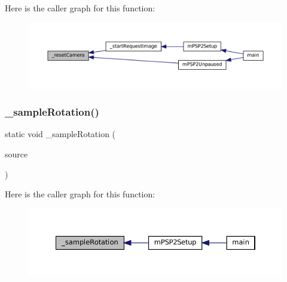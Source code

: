 Here is the caller graph for this function\+:
\nopagebreak
\begin{figure}[H]
\begin{center}
\leavevmode
\includegraphics[width=350pt]{psp2-context_8c_a523acbf5391e625edb0e8d8465ff6e51_icgraph}
\end{center}
\end{figure}
\mbox{\label{psp2-context_8c_a3759fdba466d4f2b918e28ca2a72e02d}} 
\subsubsection{\texorpdfstring{\+\_\+sample\+Rotation()}{\_sampleRotation()}}
{\footnotesize\ttfamily static void \+\_\+sample\+Rotation (\begin{DoxyParamCaption}\item[{struct m\+Rotation\+Source $\ast$}]{source }\end{DoxyParamCaption})\hspace{0.3cm}{\ttfamily [static]}}

Here is the caller graph for this function\+:
\nopagebreak
\begin{figure}[H]
\begin{center}
\leavevmode
\includegraphics[width=350pt]{psp2-context_8c_a3759fdba466d4f2b918e28ca2a72e02d_icgraph}
\end{center}
\end{figure}
\mbox{\label{psp2-context_8c_a95b8d13de5bec09567398f90454a054c}} 
